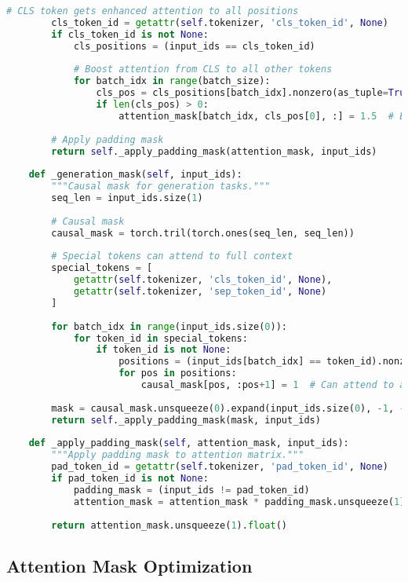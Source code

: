 \begin{lstlisting}[language=Python, caption=Dynamic attention masking based on content]
        # CLS token gets enhanced attention to all positions
        cls_token_id = getattr(self.tokenizer, 'cls_token_id', None)
        if cls_token_id is not None:
            cls_positions = (input_ids == cls_token_id)
            
            # Boost attention from CLS to all other tokens
            for batch_idx in range(batch_size):
                cls_pos = cls_positions[batch_idx].nonzero(as_tuple=True)[0]
                if len(cls_pos) > 0:
                    attention_mask[batch_idx, cls_pos[0], :] = 1.5  # Enhanced attention
                    
        # Apply padding mask
        return self._apply_padding_mask(attention_mask, input_ids)
        
    def _generation_mask(self, input_ids):
        """Causal mask for generation tasks."""
        seq_len = input_ids.size(1)
        
        # Causal mask
        causal_mask = torch.tril(torch.ones(seq_len, seq_len))
        
        # Special tokens can attend to full context
        special_tokens = [
            getattr(self.tokenizer, 'cls_token_id', None),
            getattr(self.tokenizer, 'sep_token_id', None)
        ]
        
        for batch_idx in range(input_ids.size(0)):
            for token_id in special_tokens:
                if token_id is not None:
                    positions = (input_ids[batch_idx] == token_id).nonzero(as_tuple=True)[0]
                    for pos in positions:
                        causal_mask[pos, :pos+1] = 1  # Can attend to all previous
                        
        mask = causal_mask.unsqueeze(0).expand(input_ids.size(0), -1, -1)
        return self._apply_padding_mask(mask, input_ids)
        
    def _apply_padding_mask(self, attention_mask, input_ids):
        """Apply padding mask to attention matrix."""
        pad_token_id = getattr(self.tokenizer, 'pad_token_id', None)
        if pad_token_id is not None:
            padding_mask = (input_ids != pad_token_id)
            attention_mask = attention_mask * padding_mask.unsqueeze(1) * padding_mask.unsqueeze(2)
            
        return attention_mask.unsqueeze(1).float()
\end{lstlisting}

\subsection{Attention Mask Optimization}

